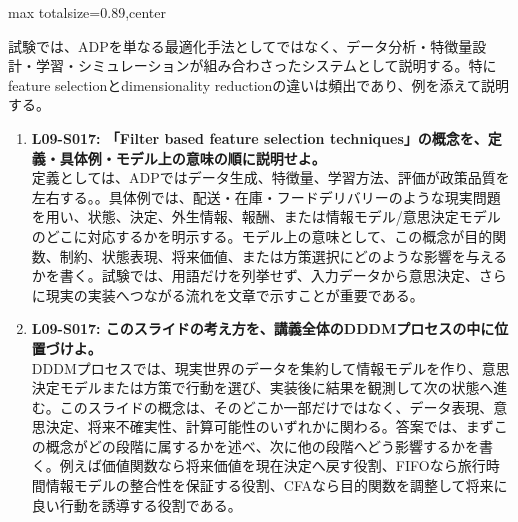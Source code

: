 \begin{minipage}[t]{0.58\textwidth}
\begin{adjustbox}{max totalsize={\textwidth}{0.89\textheight},center}
\begin{minipage}{\textwidth}
試験では、ADPを単なる最適化手法としてではなく、データ分析・特徴量設計・学習・シミュレーションが組み合わさったシステムとして説明する。特にfeature selectionとdimensionality reductionの違いは頻出であり、例を添えて説明する。\par{}\begin{enumerate}\item \textbf{L09-S017: 「Filter based feature selection techniques」の概念を、定義・具体例・モデル上の意味の順に説明せよ。}\\定義としては、ADPではデータ生成、特徴量、学習方法、評価が政策品質を左右する。。具体例では、配送・在庫・フードデリバリーのような現実問題を用い、状態、決定、外生情報、報酬、または情報モデル/意思決定モデルのどこに対応するかを明示する。モデル上の意味として、この概念が目的関数、制約、状態表現、将来価値、または方策選択にどのような影響を与えるかを書く。試験では、用語だけを列挙せず、入力データから意思決定、さらに現実の実装へつながる流れを文章で示すことが重要である。\item \textbf{L09-S017: このスライドの考え方を、講義全体のDDDMプロセスの中に位置づけよ。}\\DDDMプロセスでは、現実世界のデータを集約して情報モデルを作り、意思決定モデルまたは方策で行動を選び、実装後に結果を観測して次の状態へ進む。このスライドの概念は、そのどこか一部だけではなく、データ表現、意思決定、将来不確実性、計算可能性のいずれかに関わる。答案では、まずこの概念がどの段階に属するかを述べ、次に他の段階へどう影響するかを書く。例えば価値関数なら将来価値を現在決定へ戻す役割、FIFOなら旅行時間情報モデルの整合性を保証する役割、CFAなら目的関数を調整して将来に良い行動を誘導する役割である。\end{enumerate}
\end{minipage}
\end{adjustbox}
\end{minipage}


